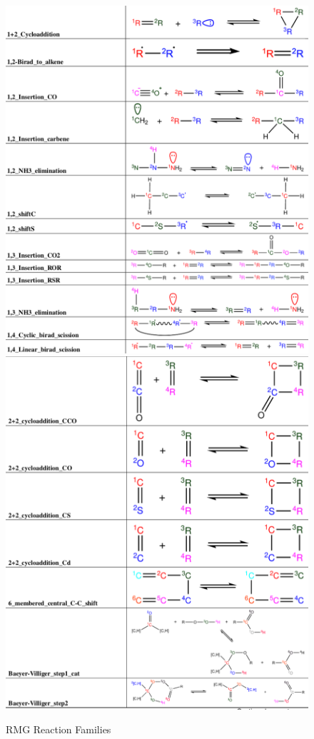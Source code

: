 \begin{figure}[ht]
     \centering
     \includegraphics[scale=0.5, keepaspectratio]{images/rxn_fam1.png}
     \includegraphics[scale=0.5, keepaspectratio]{images/rxn_fam2.png}
     \caption{RMG Reaction Families\cite{Gao2016ReactionMechanisms}}
     \label{fig:rxn_fam1}
 \end{figure}
 
